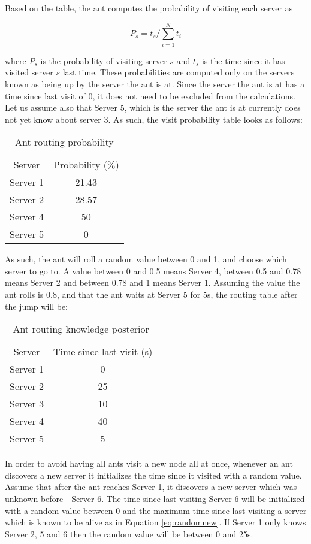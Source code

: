 \documentclass{sig-alternate}
\begin{document}
Based on the table, the ant computes the probability of visiting each server as

\begin{equation}
P_s = t_s / \sum_{i=1}^{N} t_i
\end{equation}

where $P_s$ is the probability of visiting server $s$ and $t_s$ is the time since it has visited server $s$ last time. These probabilities are computed only on the servers known as being up by the server the ant is at. Since the server the ant is at has a time since last visit of 0, it does not need to be excluded from the calculations. Let us assume also that Server 5, which is the server the ant is at currently does not yet know about server 3. As such, the visit probability table looks as follows:

\begin{table}[]
\centering
\begin{tabular}{c|c}
Server & Probability (\%) \\
Server 1 & 21.43 \\
Server 2 & 28.57 \\
Server 4 & 50 \\
Server 5 & 0 \\
\end{tabular}
\caption{Ant routing probability}
\label{tab:ant_prob}
\end{table}

As such, the ant will roll a random value between 0 and 1, and choose which server to go to. A value between 0 and 0.5 means Server 4, between 0.5 and 0.78 means Server 2 and between 0.78 and 1 means Server 1. Assuming the value the ant rolls is 0.8, and that the ant waits at Server 5 for 5s, the routing table after the jump will be:

\begin{table}[]
\centering
\begin{tabular}{c|c}
Server & Time since last visit (s) \\
Server 1 & 0 \\
Server 2 & 25 \\
Server 3 & 10 \\
Server 4 & 40 \\
Server 5 & 5 \\
\end{tabular}
\caption{Ant routing knowledge posterior}
\label{tab:ant_post}
\end{table}

In order to avoid having all ants visit a new node all at once, whenever an ant discovers a new server it initializes the time since it visited with a random value. Assume that after the ant reaches Server 1, it discovers a new server which was unknown before - Server 6. The time since last visiting Server 6 will be initialized with a random value between 0 and the maximum time since last visiting a server which is known to be alive as in Equation \ref{eq:randomnew}. If Server 1 only knows Server 2, 5 and 6 then the random value will be between 0 and 25s.
\end{document}
